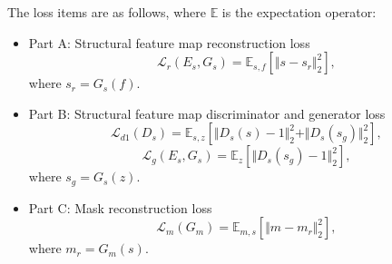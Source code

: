 \documentclass{ecai}
\begin{document}
The loss items are as follows, where $\mathbb{E}$ is the expectation operator: 
\begin{itemize}
	\item{Part A: Structural feature map reconstruction loss} 
	\begin{equation}
	\mathcal{L}_{r}(E_s,G_s)=\mathbb{E}_{s,f}[\Vert{s-s_r}\Vert_{2}^{2}],
	\end{equation}
	where $s_r=G_s(f)$.
	\item{Part B: Structural feature map discriminator and generator loss} 
	\begin{equation}
		\mathcal{L}_{d1}(D_{s})=\mathbb{E}_{s,z}[\Vert{D_{s}(s)-1}\Vert_{2}^{2}+\Vert{D_{s}(s_g)}\Vert_{2}^{2}],
	\end{equation}
	\begin{equation}
	\mathcal{L}_{g}(E_s,G_s)=\mathbb{E}_{z}[\Vert{D_{s}(s_g)-1}\Vert_{2}^{2}],	
	\end{equation}
	where $s_g=G_s(z)$.
%
%	
	\item{Part C: Mask reconstruction loss}
	\begin{equation}
	\mathcal{L}_{m}(G_m)=\mathbb{E}_{m,s}[\Vert{m-m_r}\Vert_{2}^{2}],
	\end{equation}
	where $m_r=G_m(s)$.
\end{itemize}
\end{document}
